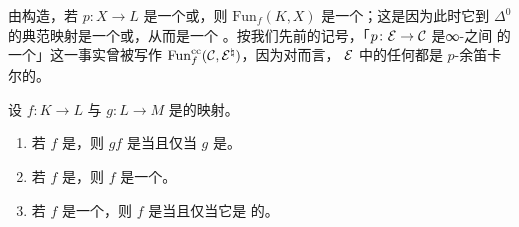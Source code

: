 \begin{remark}\label{rem:fun-f-groupoid}
由构造，若 $p\colon X \to L$ 是一个\trRightFibration{}或\trLeftFibration{}，则
$\mathrm{Fun}_f(K, X)$ 是一个\trInfinityGroupoid{}；这是因为此时它到 $\Delta^0$
的典范映射是一个\trRightFibration{}或\trLeftFibration{}，从而是一个%
\trKanFibration{}。按我们先前的记号，「$p\colon \mathcal{E} \to \mathcal{C}$ 是∞-\trCategories{}之间
的一个\trLeftFibration{}」这一事实曾被写作
$\mathrm{Fun}^{\mathrm{cc}}_f(\mathcal{C}, \mathcal{E}^{\natural})$，因为对\trLeftFibration{}而言，
$\mathcal{E}$ 中的任何\trMorphism{}都是 $p$-余笛卡尔的。
\end{remark}

\begin{proposition}\label{prop:cofinal-composition}
设 $f\colon K \to L$ 与 $g\colon L \to M$ 是\trSimplicialSets{}的映射。
\begin{enumerate}[label=(\arabic*)]
  \item 若 $f$ 是\trCofinal{}，则 $gf$ 是\trCofinal{}当且仅当 $g$ 是。
  \item 若 $f$ 是\trCofinal{}，则 $f$ 是一个\trWeakEquivalence{}。
  \item 若 $f$ 是一个\trMonomorphism{}，则 $f$ 是\trCofinal{}当且仅当它是%
        \trRightAnodyne{}的。
\end{enumerate}
\end{proposition}

